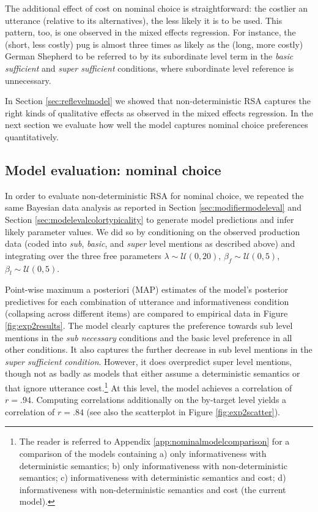 \documentclass[11pt]{article}
\newcommand{\figref}[1]{Figure \ref{#1}}
\newcommand{\appref}[1]{Appendix \ref{#1}}
\newcommand{\sectionref}[1]{Section \ref{#1}}
\begin{document}
The additional effect of cost on nominal choice is straightforward: the costlier an utterance (relative to its alternatives), the less likely it is to be used. This pattern, too, is one observed in the mixed effects regression. For instance, the (short, less costly) pug is almost three times as likely as the (long, more costly) German Shepherd to be referred to by its subordinate level term in the \emph{basic sufficient} and \emph{super sufficient} conditions, where subordinate level reference is unnecessary. 

\bigskip
In \sectionref{sec:reflevelmodel} we showed that non-deterministic RSA captures the right kinds of qualitative effects as observed in the mixed effects regression. In the next section we evaluate how well the model captures nominal choice preferences quantitatively.

\subsection{Model evaluation: nominal choice}
\label{sec:reflevelmodeleval}

In order to evaluate non-deterministic RSA for nominal choice, we repeated the same Bayesian data analysis as reported in \sectionref{sec:modifiermodeleval} and \sectionref{sec:modelevalcolortypicality} to generate model predictions and infer likely parameter values. We did so by conditioning on the observed production data (coded into \emph{sub}, \emph{basic}, and \emph{super} level mentions as described above) and integrating over the three free parameters $\lambda  \sim \mathcal{U}(0,20)$, $\beta_f  \sim \mathcal{U}(0,5)$, $\beta_l  \sim \mathcal{U}(0,5)$.


Point-wise maximum a posteriori (MAP) estimates of the model's posterior predictives for each combination of utterance and informativeness condition (collapsing across different items) are compared to empirical data in \figref{fig:exp2results}. The model clearly captures the preference towards sub level mentions in the \emph{sub necessary} conditions and the basic level preference in all other conditions. It also captures the further decrease in sub level mentions in the \emph{super sufficient condition}. However, it does overpredict super level mentions, though not as badly as models that either assume a deterministic semantics or that ignore utterance cost.\footnote{The reader is referred to \appref{app:nominalmodelcomparison} for a comparison of the models containing a) only informativeness with deterministic semantics; b) only informativeness with non-deterministic semantics; c) informativeness with deterministic semantics and cost; d) informativeness with non-deterministic semantics and cost (the current model).} At this level, the model achieves a correlation of $r = .94$. Computing correlations additionally on the by-target level yields a correlation of $r = .84$ (see also the scatterplot in \figref{fig:exp2scatter}). 
\end{document}
